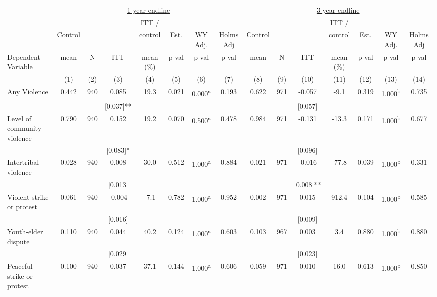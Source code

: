 \begin{tabular}{lcccccccccccccc}
\hline \noalign{\smallskip} & \multicolumn{7}{c}{\uline{\hfill 1-year endline \hfill}} & \multicolumn{7}{c}{\uline{\hfill 3-year endline \hfill}}\\
 &  &  &  & ITT / &  &  &  &  &  &  & ITT / &  &  & \\
 & Control &  &  & control & Est. & WY Adj. & Holms Adj & Control &  &  & control & Est. & WY Adj. & Holms Adj\\
Dependent Variable & mean & N & ITT & mean (\%) & p-val & p-val & p-val & mean & N & ITT & mean (\%) & p-val & p-val & p-val\\
 & (1) & (2) & (3) & (4) & (5) & (6) & (7) & (8) & (9) & (10) & (11) & (12) & (13) & (14)\\
\noalign{\smallskip}\hline \noalign{\smallskip}Any Violence & 0.442 & 940 & 0.085 & 19.3 & 0.021 & 0.000\textsuperscript{a} & 0.193 & 0.622 & 971 & -0.057 & -9.1 & 0.319 & 1.000\textsuperscript{b} & 0.735\\
 &  &  & [0.037]** &  &  &  &  &  &  & [0.057] &  &  &  & \\
Level of community violence & 0.790 & 940 & 0.152 & 19.2 & 0.070 & 0.500\textsuperscript{a} & 0.478 & 0.984 & 971 & -0.131 & -13.3 & 0.171 & 1.000\textsuperscript{b} & 0.677\\
 &  &  & [0.083]* &  &  &  &  &  &  & [0.096] &  &  &  & \\
\quad Intertribal violence & 0.028 & 940 & 0.008 & 30.0 & 0.512 & 1.000\textsuperscript{a} & 0.884 & 0.021 & 971 & -0.016 & -77.8 & 0.039 & 1.000\textsuperscript{b} & 0.331\\
 &  &  & [0.013] &  &  &  &  &  &  & [0.008]** &  &  &  & \\
\quad Violent strike or protest & 0.061 & 940 & -0.004 & -7.1 & 0.782 & 1.000\textsuperscript{a} & 0.952 & 0.002 & 971 & 0.015 & 912.4 & 0.104 & 1.000\textsuperscript{b} & 0.585\\
 &  &  & [0.016] &  &  &  &  &  &  & [0.009] &  &  &  & \\
\quad Youth-elder dispute & 0.110 & 940 & 0.044 & 40.2 & 0.124 & 1.000\textsuperscript{a} & 0.603 & 0.103 & 967 & 0.003 & 3.4 & 0.880 & 1.000\textsuperscript{b} & 0.880\\
 &  &  & [0.029] &  &  &  &  &  &  & [0.023] &  &  &  & \\
\quad Peaceful strike or protest & 0.100 & 940 & 0.037 & 37.1 & 0.144 & 1.000\textsuperscript{a} & 0.606 & 0.059 & 971 & 0.010 & 16.0 & 0.613 & 1.000\textsuperscript{b} & 0.850\\

\end{tabular}
